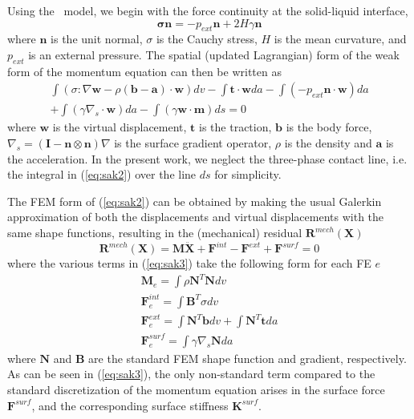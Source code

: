 \documentclass[final,authoryear,3p,times,twocolumn]{elsarticle}
\newcommand{\mbf}{\mathbf}
\begin{document}
Using the~\citet{saksonoCM2006a} model, we begin with the force continuity at the solid-liquid interface, 
\begin{equation}\label{eq:sak1} \mbf{\sigma n}=-p_{ext}\mbf{n}+2H\gamma\mbf{n}
\end{equation}
where $\mbf{n}$ is the unit normal, $\sigma$ is the Cauchy stress, $H$ is the mean curvature, and $p_{ext}$ is an external pressure.  The spatial (updated Lagrangian) form of the weak form of the momentum equation can then be written as
\begin{eqnarray}\label{eq:sak2} \int (\sigma:\nabla\mbf{w}-\rho(\mbf{b-a})\cdot\mbf{w})dv-\int \mbf{t}\cdot\mbf{w}da-\int (-p_{ext}\mbf{n}\cdot\mbf{w})da \\ \nonumber
+\int (\gamma\nabla_{s}\cdot\mbf{w})da-\int (\gamma\mbf{w}\cdot\mbf{m})ds = 0
\end{eqnarray}
where $\mbf{w}$ is the virtual displacement, $\mbf{t}$ is the traction, $\mbf{b}$ is the body force, $\nabla_{s}=(\mbf{I}-\mbf{n}\otimes\mbf{n})\nabla$ is the surface gradient operator, $\rho$ is the density and $\mbf{a}$ is the acceleration.  In the present work, we neglect the three-phase contact line, i.e. the integral in (\ref{eq:sak2}) over the line $ds$ for simplicity.

The FEM form of (\ref{eq:sak2}) can be obtained by making the usual Galerkin approximation of both the displacements and virtual displacements with the same shape functions, resulting in the (mechanical) residual $\mbf{R}^{mech}(\mbf{X})$
\begin{equation}\label{eq:sak3} \mbf{R}^{mech}(\mbf{X})=\mbf{M}\ddot{\mbf{X}}+\mbf{F}^{int}-\mbf{F}^{ext}+\mbf{F}^{surf}=0
\end{equation}
where the various terms in (\ref{eq:sak3}) take the following form for each FE $e$
\begin{eqnarray}\label{eq:sak4} \mbf{M}_{e}=\int\rho\mbf{N}^{T}\mbf{N}dv \\ \nonumber
\mbf{F}_{e}^{int}=\int\mbf{B}^{T}\sigma dv \\ \nonumber
\mbf{F}_{e}^{ext}=\int\mbf{N}^{T}\mbf{b}dv + \int\mbf{N}^{T}\mbf{t}da \\ \nonumber
\mbf{F}_{e}^{surf}=\int\gamma\nabla_{s}\mbf{N}da
\end{eqnarray}
where $\mbf{N}$ and $\mbf{B}$ are the standard FEM shape function and gradient, respectively.  As can be seen in (\ref{eq:sak3}), the only non-standard term compared to the standard discretization of the momentum equation arises in the surface force $\mbf{F}^{surf}$, and the corresponding surface stiffness $\mbf{K}^{surf}$.  
\end{document}
